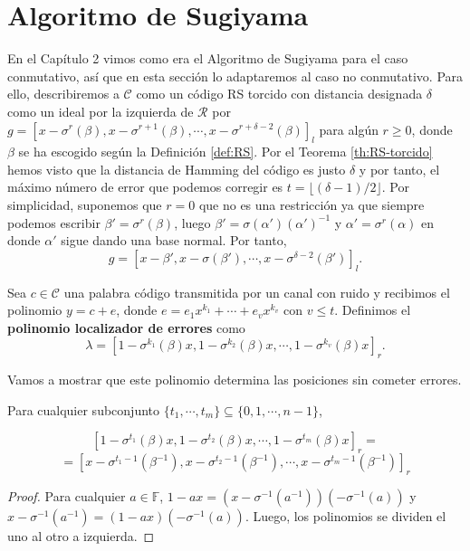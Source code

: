 \section{Algoritmo de Sugiyama}

En el Capítulo 2 vimos como era el Algoritmo de Sugiyama para el caso conmutativo, así que en esta sección lo adaptaremos al caso no conmutativo. Para ello, describiremos a $\mathcal{C}$ como un código RS torcido con distancia designada $\delta$ como un ideal por la izquierda de $\mathcal{R}$ por $g = [x-\sigma^r(\beta), x-\sigma^{r+1}(\beta),\cdots,x-\sigma^{r+\delta-2}(\beta)]_l $ para algún $r \geq 0$, donde $\beta$ se ha escogido según la Definición \ref{def:RS}. Por el Teorema \ref{th:RS-torcido} hemos visto que la distancia de Hamming del código es justo $\delta$ y por tanto, el máximo número de error que podemos corregir es $t = \lfloor (\delta -1)/2 \rfloor$. Por simplicidad, suponemos que $r = 0$ que no es una restricción ya que siempre podemos escribir $\beta' = \sigma^r(\beta)$, luego $\beta' = \sigma(\alpha')(\alpha')^{-1}$ y $\alpha' = \sigma^r(\alpha)$ en donde $\alpha'$ sigue dando una base normal. Por tanto, 
\[ g = [x-\beta', x-\sigma(\beta'),\cdots,x-\sigma^{\delta-2}(\beta')]_l .\]


Sea $c \in \mathcal{C}$ una palabra código transmitida por un canal con ruido y recibimos el polinomio $y = c + e$, donde $e = e_1x^{k_1} + \cdots + e_vx^{k_v}$ con $ v \leq t$. Definimos el \textbf{polinomio localizador de errores} como 
\[ \lambda = [1-\sigma^{k_1}(\beta)x,1-\sigma^{k_2}(\beta)x,\cdots,1-\sigma^{k_v}(\beta)x ]_r .\]

Vamos a mostrar que este polinomio determina las posiciones sin cometer errores.

\begin{lemma}
\label{le:siete}
Para cualquier subconjunto $\{ t_1,\cdots,t_m \} \subseteq \{ 0,1,\cdots,n-1 \}$, 

\[ [1-\sigma^{t_1}(\beta)x,1-\sigma^{t_2}(\beta)x,\cdots,1-\sigma^{t_m}(\beta)x ]_r =\] \[ = [x-\sigma^{t_1-1}(\beta^{-1}),x-\sigma^{t_2-1}(\beta^{-1}),\cdots,x-\sigma^{t_m-1}(\beta^{-1}) ]_r\]
    
\end{lemma}
\begin{proof}
    Para cualquier $a \in \mathbb{F}$, $1-ax = (x - \sigma^{-1}(a^{-1}))(-\sigma^{-1}(a))$ y $x - \sigma^{-1}(a^{-1}) = (1-ax)(-\sigma^{-1}(a))$. Luego, los polinomios se dividen el uno al otro a izquierda.
\end{proof}


